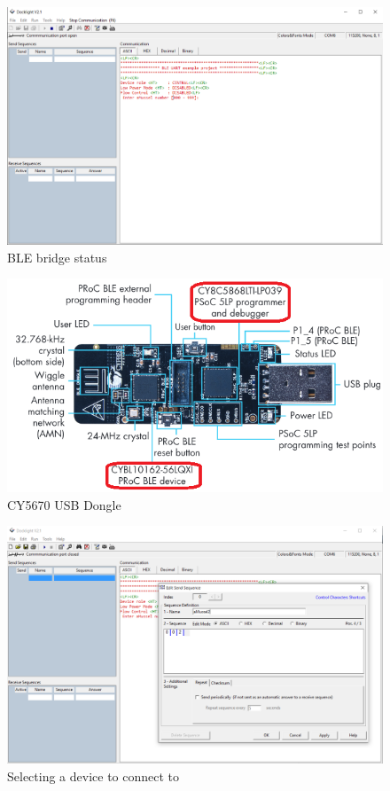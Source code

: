 \begin{figure}[htb]
    \centering
	  \includegraphics[width=\linewidth]{figures/Docklight_BLE_dongle.png}
	\caption{BLE bridge status}
	\label{fig:docklight_ble_bridge_status}
\end{figure}

\begin{figure}[htb]
    \centering
	  \includegraphics[width=0.6\linewidth]{figures/USB_dongle_parts.png}
	\caption{CY5670 USB Dongle}
	\label{fig:usb_dongle_parts}
\end{figure}

\begin{figure}[htb]
    \centering
	  \includegraphics[width=\linewidth]{figures/Docklight_aMussel_selection.png}
	\caption{Selecting a device to connect to}
	\label{fig:docklight_aMussel_selection}
\end{figure}

